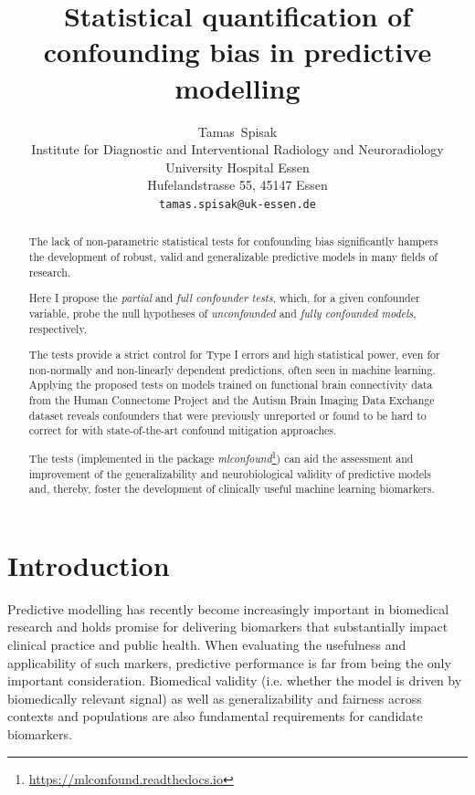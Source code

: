 \documentclass{article}
\title{Statistical quantification of confounding bias in predictive modelling}
\author{
  Tamas~Spisak \\
  Institute for Diagnostic and Interventional Radiology and Neuroradiology \\
  University Hospital Essen\\
  Hufelandstrasse 55, 45147 Essen \\
  \texttt{tamas.spisak@uk-essen.de} \\
}
\begin{document}
\maketitle

\begin{abstract} %
The lack of non-parametric statistical tests for confounding bias significantly hampers the development of robust, valid and generalizable predictive models in many fields of research.

Here I propose the \emph{partial} and \emph{full confounder tests}, which, for a given confounder variable, probe the null hypotheses of \emph{unconfounded} and \emph{fully confounded models}, respectively.

The tests provide a strict control for Type I errors and high statistical power, even for non-normally and non-linearly dependent predictions, often seen in machine learning.
Applying the proposed tests on models trained on functional brain connectivity data from the Human Connectome Project and the Autism Brain Imaging Data Exchange dataset reveals confounders that were previously unreported or found to be hard to correct for with state-of-the-art confound mitigation approaches.

The tests (implemented in the package \emph{mlconfound}\footnote{\href{https://mlconfound.readthedocs.io}{https://mlconfound.readthedocs.io}}) can aid the assessment and improvement of the generalizability and neurobiological validity of predictive models and, thereby, foster the development of clinically useful machine learning biomarkers.
\end{abstract}



\section{Introduction}

Predictive modelling has recently become increasingly important in biomedical research and holds promise for delivering biomarkers that substantially impact clinical practice and public health\citep{kent2018personalized, spisak2020pain, walsh2021dome}. When evaluating the usefulness and applicability of such markers, predictive performance is far from being the only important consideration. Biomedical validity (i.e. whether the model is driven by biomedically relevant signal) as well as generalizability and fairness across contexts and populations are also fundamental requirements for candidate biomarkers\citep{woo2017building, obermeyer2019dissecting, mehrabi2021survey}.
\end{document}
